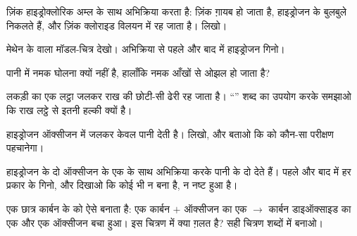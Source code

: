 \begin{exercise}[$\star\star$]\label{exo:g7:chemical-reactions:6}
ज़िंक हाइड्रोक्लोरिक अम्ल के साथ अभिक्रिया करता है: ज़िंक ग़ायब हो जाता है,
हाइड्रोजन के बुलबुले निकलते हैं, और ज़िंक क्लोराइड विलयन में रह जाता है।
 लिखो।
\end{exercise}

\begin{exercise}[$\star\star$]\label{exo:g7:chemical-reactions:7}
मेथेन के  वाला मॉडल-चित्र देखो। अभिक्रिया से पहले और बाद में
हाइड्रोजन  गिनो।
\end{exercise}

\begin{exercise}[$\star\star$]\label{exo:g7:chemical-reactions:8}
पानी में नमक घोलना  क्यों नहीं है, हालाँकि नमक आँखों से
ओझल हो जाता है?
\end{exercise}

\begin{exercise}[$\star\star$]\label{exo:g7:chemical-reactions:9}
लकड़ी का एक लट्ठा जलकर राख की छोटी-सी ढेरी रह जाता है। ``'' शब्द का
उपयोग करके समझाओ कि राख लट्ठे से इतनी हल्की क्यों है।
\end{exercise}

\begin{exercise}[$\star\star$]\label{exo:g7:chemical-reactions:10}
हाइड्रोजन ऑक्सीजन में जलकर केवल पानी देती है।  लिखो,
और बताओ कि  को कौन-सा परीक्षण पहचानेगा।
\end{exercise}

\begin{exercise}[$\star\star\star$]\label{exo:g7:chemical-reactions:11}
हाइड्रोजन के दो   ऑक्सीजन के एक   के साथ अभिक्रिया
करके पानी के दो   देते हैं। पहले और बाद में हर प्रकार के 
गिनो, और दिखाओ कि कोई भी न बना है, न नष्ट हुआ है।
\end{exercise}

\begin{exercise}[$\star\star\star$]\label{exo:g7:chemical-reactions:12}
एक छात्र कार्बन के  को ऐसे बनाता है: एक कार्बन  $+$ ऑक्सीजन का
एक  $\longrightarrow$ कार्बन डाइऑक्साइड का एक  और एक ऑक्सीजन
 बचा हुआ। इस चित्रण में क्या ग़लत है? सही चित्रण शब्दों
में बनाओ।
\end{exercise}

